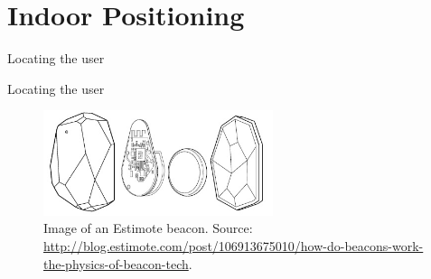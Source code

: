 \section{Indoor Positioning}

\begin{frame}{Locating the user}{}
\centering
\begin{figure}[!htb]%
\label{fig:prototype3-room-screenshot}
\end{figure}
\end{frame}

\begin{frame}{Locating the user}{}
\begin{figure}[!htb]
  \includegraphics[width=0.6\textwidth]{../images/estimotebeacon}
  \caption{Image of an Estimote beacon. Source: \protect\url{http://blog.estimote.com/post/106913675010/how-do-beacons-work-the-physics-of-beacon-tech}.}
  \label{fig:estimotebeacon}
\end{figure}
\end{frame}